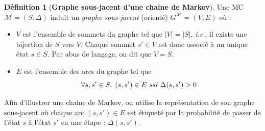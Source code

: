 \documentclass[12pt,a4paper]{report}
\theoremstyle{definition}%
\newtheorem{definition}{Définition}[chapter]
\theoremstyle{remark}
\newcommand{\ssi}{\textit{ssi} }
\newcommand{\ie}{\textit{i.e.}, }
\let\labelitemi\labelitemii
\begin{document}
\begin{definition}[\textbf{Graphe sous-jacent d'une chaine de Markov}]
	Une MC $\mathcal{M} = (S, \Delta)$ induit un \textit{graphe sous-jacent} (orienté) $G^\mathcal{M} = (V, E)$ où :
	\begin{itemize}
		\renewcommand{\labelitemi}{\tiny$\bullet$}
		\item $V$ est l'ensemble de sommets du graphe tel que $|V| = |S|$, \ie il existe une bijection de $S$ vers $V$. Chaque sommet $s' \in V$ est donc associé à un unique état $s \in S$. Par abus de langage, on dit que $V = S$.
		\item $E$ est l'ensemble des arcs du graphe tel que \[ \forall s, s' \in S, \; (s, s') \in E \text{ \ssi} \Delta(s, s') > 0\]
	\end{itemize}
\end{definition}

Afin d'illustrer une chaine de Markov, on utilise la représentation de son graphe sous-jacent où 
chaque arc $(s, s') \in E$ est étiqueté par la probabilité de passer de l'état $s$ à l'état $s'$ en une étape : $\Delta(s, s')$.
\end{document}
